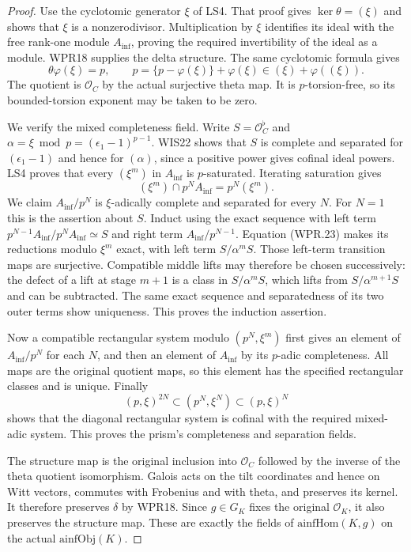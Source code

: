 \begin{proof}
Use the cyclotomic generator $\xi$ of LS4. That proof gives
$\ker\theta=(\xi)$ and shows that $\xi$ is a nonzerodivisor.
Multiplication by $\xi$ identifies its ideal with the free
rank-one module $A_{\mathrm{inf}}$, proving the required invertibility
of the ideal as a module. WPR18 supplies the delta structure.
The same cyclotomic formula gives
\[
 \theta\varphi(\xi)=p,
 \qquad p=\{p-\varphi(\xi)\}+\varphi(\xi)
                  \in(\xi)+\varphi((\xi)).                 \tag{WPR.22}
\]
The quotient is $\mathcal O_C$ by the actual surjective theta
map. It is $p$-torsion-free, so its bounded-torsion exponent may
be taken to be zero.

We verify the mixed completeness field. Write $S=\mathcal O_C^\flat$
and $\alpha=\xi\bmod p=(\epsilon_1-1)^{p-1}$.
WIS22 shows that $S$ is complete and separated for
$(\epsilon_1-1)$ and hence for $(\alpha)$, since a positive
power gives cofinal ideal powers. LS4 proves that every
$(\xi^m)$ in $A_{\mathrm{inf}}$ is $p$-saturated. Iterating saturation
gives
\[
             (\xi^m)\cap p^NA_{\mathrm{inf}}=p^N(\xi^m).             \tag{WPR.23}
\]
We claim $A_{\mathrm{inf}}/p^N$ is $\xi$-adically complete and separated
for every $N$. For $N=1$ this is the assertion about $S$.
Induct using the exact sequence with left term
$p^{N-1}A_{\mathrm{inf}}/p^NA_{\mathrm{inf}}\simeq S$ and right term
$A_{\mathrm{inf}}/p^{N-1}$. Equation (WPR.23) makes its reductions
modulo $\xi^m$ exact, with left term $S/\alpha^mS$.
Those left-term transition maps are surjective. Compatible
middle lifts may therefore be chosen successively: the defect
of a lift at stage $m+1$ is a class in $S/\alpha^mS$, which
lifts from $S/\alpha^{m+1}S$ and can be subtracted. The same
exact sequence and separatedness of its two outer terms show
uniqueness. This proves the induction assertion.

Now a compatible rectangular system modulo $(p^N,\xi^m)$
first gives an element of $A_{\mathrm{inf}}/p^N$ for each $N$, and
then an element of $A_{\mathrm{inf}}$ by its $p$-adic completeness.
All maps are the original quotient maps, so this element has
the specified rectangular classes and is unique. Finally
\[
 (p,\xi)^{2N}\subset(p^N,\xi^N)\subset(p,\xi)^N
\]
shows that the diagonal rectangular system is cofinal with
the required mixed-adic system. This proves the prism's
completeness and separation fields.

The structure map is the original inclusion into $\mathcal O_C$
followed by the inverse of the theta quotient isomorphism.
Galois acts on the tilt coordinates and hence on Witt vectors,
commutes with Frobenius and with theta, and preserves its kernel.
It therefore preserves $\delta$ by WPR18. Since $g\in G_K$
fixes the original $\mathcal O_K$, it also preserves the
structure map. These are exactly the fields of
$\mathrm{ainfHom}(K,g)$ on the actual $\mathrm{ainfObj}(K)$.
\end{proof}

